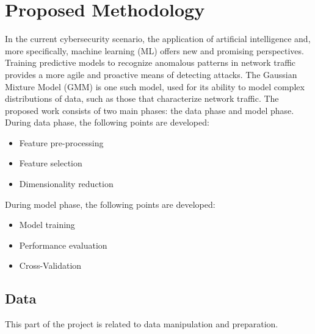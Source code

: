 \documentclass[runningheads]{llncs}
\begin{document}
\section{Proposed Methodology}
In the current cybersecurity scenario, the application of artificial intelligence and, more specifically, machine learning (ML) offers new and promising perspectives. Training predictive models to recognize anomalous patterns in network traffic provides a more agile and proactive means of detecting attacks. The Gaussian Mixture Model (GMM) is one such model, used for its ability to model complex distributions of data, such as those that characterize network traffic. The proposed work consists of two main phases: the data phase and model phase.\\During data phase, the following points are developed:
\begin{itemize}
    \item Feature pre-processing
    \item Feature selection
    \item Dimensionality reduction
\end{itemize}
During model phase, the following points are developed:
\begin{itemize}
    \item Model training
    \item Performance evaluation
    \item Cross-Validation
\end{itemize}

\subsection{Data}
This part of the project is related to data manipulation and preparation.
\end{document}
